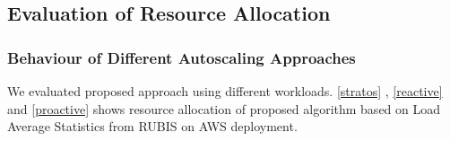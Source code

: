\subsection{Evaluation of Resource Allocation}
\subsubsection{Behaviour of Different Autoscaling Approaches}
We evaluated proposed approach using different workloads. \ref{stratos} , \ref{reactive} and \ref{proactive} shows resource allocation of proposed algorithm based on Load Average Statistics from RUBIS on AWS deployment.
